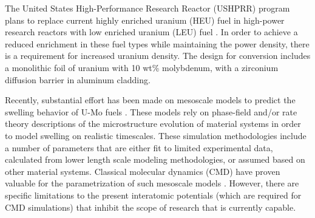 \documentclass[review]{elsarticle}
\begin{document}
The United States High-Performance Research Reactor (USHPRR) program plans to replace current highly enriched uranium (HEU) fuel in high-power research reactors with low enriched uranium (LEU) fuel \cite{snelgrove1997}. In order to achieve a reduced enrichment in these fuel types while maintaining the power density, there is a requirement for increased uranium density. The design for conversion includes a monolithic foil of uranium with 10 wt\% molybdenum, with a zirconium diffusion barrier in aluminum cladding. 



Recently, substantial effort has been made on mesoscale models to predict the swelling behavior of U-Mo fuels \cite{liang2018, liang2018a, liang2017, liang2016, ye2018, hu2017a, hu2016, hu2016a}. These models rely on phase-field and/or rate theory descriptions of the microstructure evolution of material systems in order to model swelling on realistic timescales. These simulation methodologies include a number of parameters that are either fit to limited experimental data, calculated from lower length scale modeling methodologies, or assumed based on other material systems. Classical molecular dynamics (CMD) have proven valuable for the parametrization of such mesoscale models \cite{Park2023, Park2021, BeelerMRSA, BeelerRDD, Beeler2020}. However, there are specific limitations to the present interatomic potentials (which are required for CMD simulations) that inhibit the scope of research that is currently capable. 
\end{document}
